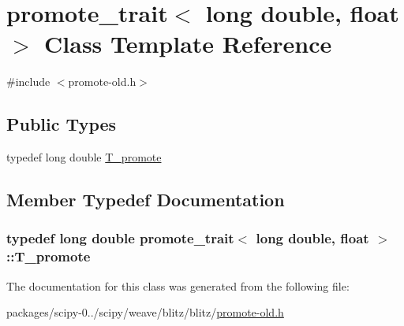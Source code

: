 \hypertarget{classpromote__trait_3_01long_01double_00_01float_01_4}{}\section{promote\+\_\+trait$<$ long double, float $>$ Class Template Reference}
\label{classpromote__trait_3_01long_01double_00_01float_01_4}


{\ttfamily \#include $<$promote-\/old.\+h$>$}

\subsection*{Public Types}
\begin{DoxyCompactItemize}
\item 
typedef long double \hyperlink{classpromote__trait_3_01long_01double_00_01float_01_4_a74bbb0aa7ea7dbd7c4fc79c67b8d7723}{T\+\_\+promote}
\end{DoxyCompactItemize}


\subsection{Member Typedef Documentation}
\hypertarget{classpromote__trait_3_01long_01double_00_01float_01_4_a74bbb0aa7ea7dbd7c4fc79c67b8d7723}{}
\subsubsection[{T\+\_\+promote}]{\setlength{\rightskip}{0pt plus 5cm}typedef long double {\bf promote\+\_\+trait}$<$ long double, float $>$\+::{\bf T\+\_\+promote}}\label{classpromote__trait_3_01long_01double_00_01float_01_4_a74bbb0aa7ea7dbd7c4fc79c67b8d7723}


The documentation for this class was generated from the following file\+:\begin{DoxyCompactItemize}
\item 
packages/scipy-\/0../scipy/weave/blitz/blitz/\hyperlink{promote-old_8h}{promote-\/old.\+h}\end{DoxyCompactItemize}
